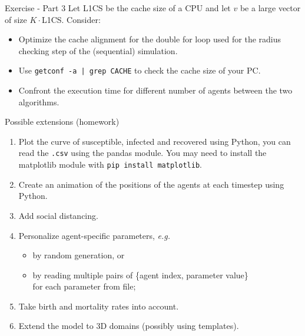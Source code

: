 \documentclass[10pt,aspectratio=169]{beamer}
\begin{document}
\begin{frame}{Exercise - Part 3}
    Let L1CS be the cache size of a CPU and let $v$ be a large vector of size $K\cdot$L1CS. Consider:
    
    \begin{itemize}
        \item Optimize the cache alignment for the double for loop used for the radius checking step of the (sequential) simulation.
        \item Use \texttt{getconf -a | grep CACHE} to check the cache size of your PC.
        \item Confront the execution time for different number of agents between the two algorithms.
    \end{itemize}
\end{frame}

\begin{frame}{Possible extensions (homework)}
\begin{enumerate}
    \item Plot the curve of susceptible, infected and recovered using Python, you can read the \texttt{.csv} using the pandas module. You may need to install the matplotlib module with \texttt{pip install matplotlib}.
    \item Create an animation of the positions of the agents at each timestep using Python.
    \item Add social distancing.
    \item Personalize agent-specific parameters, \textit{e.g.}
    \begin{itemize}
        \item by random generation, or
        \item by reading multiple pairs of \{agent index, parameter value\}\\
              for each parameter from file;
    \end{itemize}
    \item Take birth and mortality rates into account.
    \item Extend the model to 3D domains (possibly using templates).
\end{enumerate}
\end{frame}
\end{document}

